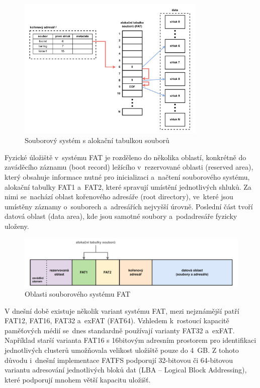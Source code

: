 \begin{figure}[h]
    \centering
    \includegraphics[width=0.80\textwidth]{obrazky-figures/fat_file_system-cz.pdf}
    
    \caption{Souborový systém s alokační tabulkou souborů~\cite{recoverit_fat_filesystem}}
    \label{fig:fat-file-system-structure}
\end{figure}

Fyzické úložiště v~systému FAT je rozděleno do několika oblastí, konkrétně do zaváděcího záznamu (boot record) ležícího v~rezervované oblasti (reserved area), který obsahuje informace nutné pro inicializaci a~načtení souborového systému, alokační tabulky FAT1 a~FAT2, které spravují umístění jednotlivých shluků. Za nimi se~nachází oblast kořenového adresáře (root directory), ve~které jsou umístěny záznamy o~souborech a~adresářích nejvyšší úrovně. Poslední část tvoří datová oblast (data area), kde jsou samotné soubory a~podadresáře fyzicky uloženy.~\cite{recoverit_fat_filesystem}

\begin{figure}[h]
    \centering
    \includegraphics[width=1.00\textwidth]{obrazky-figures/fatfs_structure-cz.pdf}
    
    \caption{Oblasti souborového systému FAT~\cite{recoverit_fat_filesystem}}
    \label{fig:fatfs-structure}
\end{figure}

V dnešní době existuje několik variant systému FAT, mezi nejznámější patří FAT12, FAT16, FAT32 a~exFAT (FAT64). Vzhledem k~rostoucí kapacitě paměťových médií se~dnes standardně používají varianty FAT32 a~exFAT. Například starší varianta FAT16 s 16bitovým adresním prostorem pro identifikaci jednotlivých clusterů umožňovala velikost uložiště pouze do 4~GB. Z tohoto důvodu i~dnešní implementace FATFS podporují 32-bitovou či 64-bitovou variantu adresování jednotlivých bloků dat (LBA -- Logical Block Addressing), které podporují mnohem větší kapacitu uložišť.~\cite{elm_fat_filesystem_app_note}

